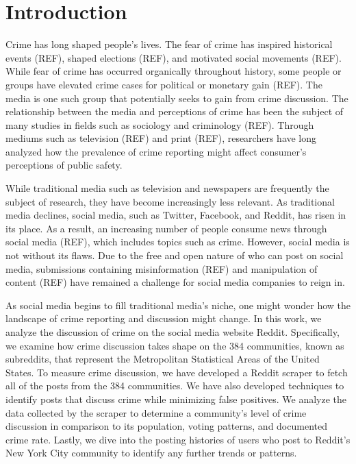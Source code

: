 \documentclass[12pt,oneside, letterpaper]{book}
\begin{document}
\mainmatter
{}

\chapter{Introduction}

\par Crime has long shaped people's lives. The fear of crime has inspired historical events (REF), shaped elections (REF), and motivated social movements (REF). While fear of crime has occurred organically throughout history, some people or groups have elevated crime cases for political or monetary gain (REF). The media is one such group that potentially seeks to gain from crime discussion. The relationship between the media and perceptions of crime has been the subject of many studies in fields such as sociology and criminology (REF). Through mediums such as television (REF) and print (REF), researchers have long analyzed how the prevalence of crime reporting might affect consumer's perceptions of public safety.

\par While traditional media such as television and newspapers are frequently the subject of research, they have become increasingly less relevant. As traditional media declines, social media, such as Twitter, Facebook, and Reddit, has risen in its place. As a result, an increasing number of people consume news through social media (REF), which includes topics such as crime. However, social media is not without its flaws. Due to the free and open nature of who can post on social media, submissions containing misinformation (REF) and manipulation of content (REF) have remained a challenge for social media companies to reign in.

\par As social media begins to fill traditional media's niche, one might wonder how the landscape of crime reporting and discussion might change. In this work, we analyze the discussion of crime on the social media website Reddit. Specifically, we examine how crime discussion takes shape on the 384 communities, known as subreddits, that represent the Metropolitan Statistical Areas of the United States. To measure crime discussion, we have developed a Reddit scraper to fetch all of the posts from the 384 communities. We have also developed techniques to identify posts that discuss crime while minimizing false positives. We analyze the data collected by the scraper to determine a community's level of crime discussion in comparison to its population, voting patterns, and documented crime rate. Lastly, we dive into the posting histories of users who post to Reddit's New York City community to identify any further trends or patterns.
\end{document}
